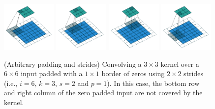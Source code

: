 \documentclass[notitlepage]{report}
\begin{document}
\begin{figure}[p]
    \centering
    \includegraphics[width=0.24\textwidth]{pdf/padding_strides_odd_00.pdf}
    \includegraphics[width=0.24\textwidth]{pdf/padding_strides_odd_01.pdf}
    \includegraphics[width=0.24\textwidth]{pdf/padding_strides_odd_02.pdf}
    \includegraphics[width=0.24\textwidth]{pdf/padding_strides_odd_03.pdf}
    \caption{\label{fig:padding_strides_odd} (Arbitrary padding and strides)
        Convolving a $3 \times 3$ kernel over a $6 \times 6$ input padded with
        a $1 \times 1$ border of zeros using $2 \times 2$ strides (i.e.,
        $i = 6$, $k = 3$, $s = 2$ and $p = 1$). In this case, the bottom row
        and right column of the zero padded input are not covered by the
        kernel.}
\end{figure}
\end{document}
